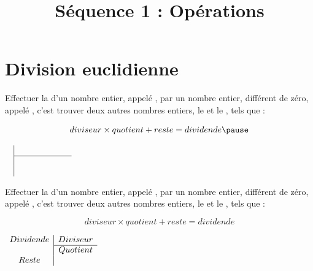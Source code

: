 \documentclass[xcolor={dvipsnames}]{beamer}
\title{Séquence 1 : Opérations}
\date{ }
\begin{document}
\begin{frame}
  \titlepage 
\end{frame}


\begin{frame}{}
	
\end{frame}

\section{Division euclidienne}

\begin{frame}
	\begin{mydef}
		Effectuer la  d’un nombre entier, appelé \pause  {}, par un nombre entier, différent de zéro, appelé \pause  {}, c’est trouver deux autres nombres entiers, le \pause {} et le , tels que : \pause
		
		\begin{equation*}
			diviseur \times quotient + reste = dividende \pause	
		\end{equation*}
	\end{mydef}

	\begin{center}
		$\begin{array}{c|c}
			 & \hspace*{2cm} \\
			\cline{2-2}
			&  \\
			 & \\
		\end{array}$
	\end{center}

\end{frame}


\begin{frame}
	\begin{mydef}
		Effectuer la  d’un nombre entier, appelé   , par un nombre entier, différent de zéro, appelé   , c’est trouver deux autres nombres entiers, le   et le , tels que : 
		
		\begin{equation*}
			diviseur \times quotient + reste = dividende 
		\end{equation*}
	\end{mydef}
	
	\begin{center}
		$\begin{array}{c|c}
			Dividende & Diviseur \\
			\cline{2-2}
			& Quotient \\
			Reste & \\
		\end{array}$
	\end{center}
	
\end{frame}
\end{document}

